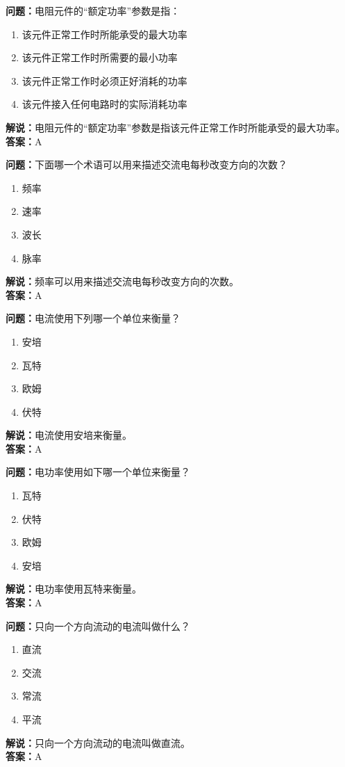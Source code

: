 \documentclass[UTF8]{ctexbook}
\begin{document}
\textbf{问题：}电阻元件的“额定功率”参数是指：
\begin{enumerate}[label=\Alph*), leftmargin=3em]
  \item 该元件正常工作时所能承受的最大功率
  \item 该元件正常工作时所需要的最小功率
  \item 该元件正常工作时必须正好消耗的功率
  \item 该元件接入任何电路时的实际消耗功率
\end{enumerate}
\textbf{解说：}电阻元件的“额定功率”参数是指该元件正常工作时所能承受的最大功率。\\
\textbf{答案：}A

\textbf{问题：}下面哪一个术语可以用来描述交流电每秒改变方向的次数？
\begin{enumerate}[label=\Alph*), leftmargin=3em]
  \item 频率
  \item 速率
  \item 波长
  \item 脉率
\end{enumerate}
\textbf{解说：}频率可以用来描述交流电每秒改变方向的次数。\\
\textbf{答案：}A

\textbf{问题：}电流使用下列哪一个单位来衡量？
\begin{enumerate}[label=\Alph*), leftmargin=3em]
  \item 安培
  \item 瓦特
  \item 欧姆
  \item 伏特
\end{enumerate}
\textbf{解说：}电流使用安培来衡量。\\
\textbf{答案：}A

\textbf{问题：}电功率使用如下哪一个单位来衡量？
\begin{enumerate}[label=\Alph*), leftmargin=3em]
  \item 瓦特
  \item 伏特
  \item 欧姆
  \item 安培
\end{enumerate}
\textbf{解说：}电功率使用瓦特来衡量。\\
\textbf{答案：}A

\textbf{问题：}只向一个方向流动的电流叫做什么？
\begin{enumerate}[label=\Alph*), leftmargin=3em]
  \item 直流
  \item 交流
  \item 常流
  \item 平流
\end{enumerate}
\textbf{解说：}只向一个方向流动的电流叫做直流。\\
\textbf{答案：}A
\end{document}
